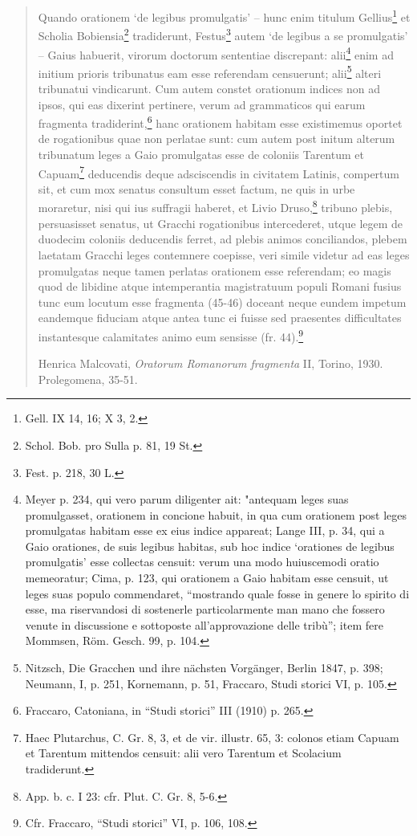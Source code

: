 \begin{quotation}
Quando orationem `de legibus promulgatis' – hunc enim titulum Gellius\footnote{Gell. IX 14, 16; X 3, 2.} et Scholia Bobiensia\footnote{Schol. Bob. pro Sulla p. 81, 19 St.} tradiderunt, Festus\footnote{Fest. p. 218, 30 L.} autem `de legibus a se promulgatis' – Gaius habuerit, virorum doctorum sententiae discrepant: alii\footnote{Meyer p. 234, qui vero parum diligenter ait: "antequam leges suas promulgasset, orationem in concione habuit, in qua cum orationem post leges promulgatas habitam esse ex eius indice appareat; Lange III, p. 34, qui a Gaio orationes, de suis legibus habitas, sub hoc indice `orationes de legibus promulgatis' esse collectas censuit: verum una modo huiuscemodi oratio memeoratur; Cima, p. 123, qui orationem a Gaio habitam esse censuit, ut leges suas populo commendaret, ``mostrando quale fosse in genere lo spirito di esse, ma riservandosi di sostenerle particolarmente man mano che fossero venute in discussione e sottoposte all'approvazione delle tribù''; item fere Mommsen, Röm. Gesch. 99, p. 104.} enim ad initium prioris tribunatus eam esse referendam censuerunt; alii\footnote{Nitzsch, Die Gracchen und ihre nächsten Vorgänger, Berlin 1847, p. 398; Neumann, I, p. 251, Kornemann, p. 51, Fraccaro, Studi storici VI, p. 105.} alteri tribunatui vindicarunt. Cum autem constet orationum indices non ad ipsos, qui eas dixerint pertinere, verum ad grammaticos qui earum fragmenta tradiderint,\footnote{Fraccaro, Catoniana, in ``Studi storici'' III (1910) p. 265.} hanc orationem habitam esse existimemus oportet de rogationibus quae non perlatae sunt: cum autem post initum alterum tribunatum leges a Gaio promulgatas esse de coloniis Tarentum et Capuam\footnote{Haec Plutarchus, C. Gr. 8, 3, et de vir. illustr. 65, 3: colonos etiam Capuam et Tarentum mittendos censuit: alii vero Tarentum et Scolacium tradiderunt.} deducendis deque adsciscendis in civitatem Latinis, compertum sit, et cum mox senatus consultum esset factum, ne quis in urbe moraretur, nisi qui ius suffragii haberet, et Livio Druso,\footnote{App. b. c. I 23: cfr. Plut. C. Gr. 8, 5-6.} tribuno plebis, persuasisset senatus, ut Gracchi rogationibus intercederet, utque legem de duodecim coloniis deducendis ferret, ad plebis animos conciliandos, plebem laetatam Gracchi leges contemnere coepisse, veri simile videtur ad eas leges promulgatas neque tamen perlatas orationem esse referendam; eo magis quod de libidine atque intemperantia magistratuum populi Romani fusius tunc eum locutum esse fragmenta (45-46) doceant neque eundem impetum eandemque fiduciam atque antea tunc ei fuisse sed praesentes difficultates instantesque calamitates animo eum sensisse (fr. 44).\footnote{Cfr. Fraccaro, ``Studi storici'' VI, p. 106, 108.}

\noindent Henrica Malcovati, \textit{Oratorum Romanorum fragmenta} II, Torino, 1930. Prolegomena, 35-51.
\end{quotation}

